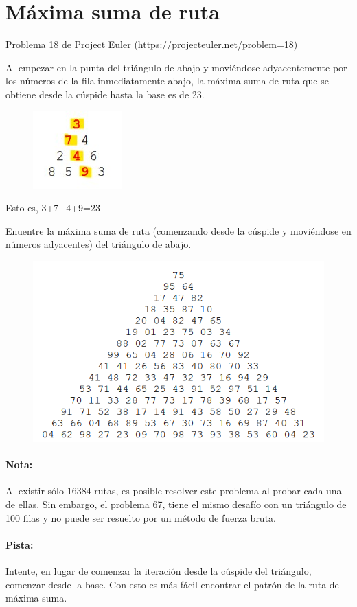 \section{Máxima suma de ruta}

Problema 18 de Project Euler (\url{https://projecteuler.net/problem=18})

Al empezar en la punta del triángulo de abajo y moviéndose adyacentemente por los números de la fila inmediatamente abajo, la máxima suma de ruta que se obtiene desde la cúspide hasta la base es de 23.

\begin{figure}[h]
    \centering
    \includegraphics{Guia/triangulochico.jpg}    
\end{figure}

Esto es, 3+7+4+9=23

Enuentre la máxima suma de ruta (comenzando desde la cúspide y moviéndose en números adyacentes) del triángulo de abajo.

\begin{figure}[H]
    \centering
    \includegraphics{Guia/triangulogrande.PNG}
\end{figure}

\paragraph{Nota:} Al existir sólo 16384 rutas, es posible resolver este problema al probar cada una de ellas. Sin embargo, el problema 67, tiene el mismo desafío con un triángulo de 100 filas y no puede ser resuelto por un método de fuerza bruta.

\paragraph{Pista:} Intente, en lugar de comenzar la iteración desde la cúspide del triángulo, comenzar desde la base. Con esto es más fácil encontrar el patrón de la ruta de máxima suma.